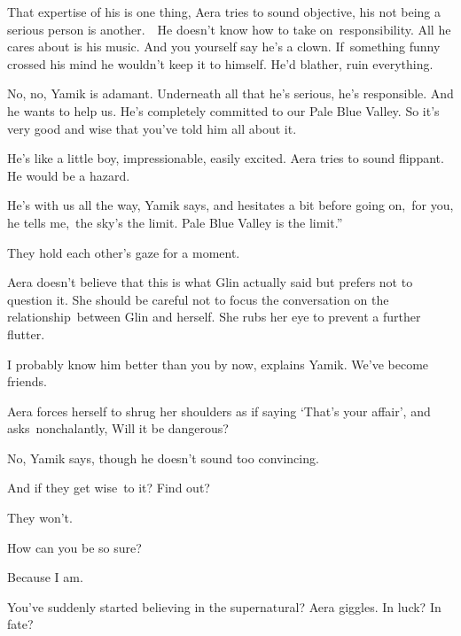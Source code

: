 \documentclass[letterpaper]{article}
\begin{document}
{\textquotedbl}That expertise of his is one thing,{\textquotedbl} Aera tries to sound objective, {\textquotedbl}his not
being a serious person is another.\ \ He doesn't know how to take on~responsibility. All he cares about is his music.
And you yourself say he's a clown. If~something funny crossed his mind he wouldn't keep it to himself. He'd blather,
ruin everything.{\textquotedbl} 

{\textquotedbl}No, no,{\textquotedbl} Yamik is adamant. {\textquotedbl}Underneath all that he's serious, he's
responsible. And he wants to help us. He's completely committed to our Pale Blue Valley. So it's very good and wise
that you've told him all about it.{\textquotedbl} 

{\textquotedbl}He's like a little boy, impressionable, easily excited.{\textquotedbl} Aera tries to sound flippant.
{\textquotedbl}He would be a hazard.{\textquotedbl}

{\textquotedbl}He's with us all the way,{\textquotedbl} Yamik says, and hesitates a bit before going
on,\textcolor{red}{\ }{\textquotedbl}for you, he tells me,~the sky's the limit. Pale Blue Valley is the limit.''

They hold each other's gaze for a moment.

Aera doesn't believe that this is what Glin actually said but prefers not to question it. She should be careful not to
focus the conversation on the relationship~between Glin and herself. She rubs her eye to prevent a further flutter.

{\textquotedbl}I probably know him better than you by now,{\textquotedbl} explains Yamik. {\textquotedbl}We've become
friends.{\textquotedbl} 

Aera forces herself to shrug her shoulders as if saying `That's your affair', and asks~nonchalantly, {\textquotedbl}Will
it be dangerous?{\textquotedbl} 

{\textquotedbl}No,{\textquotedbl} Yamik says, though he doesn't sound too convincing. 

{\textquotedbl}And if they get wise\textcolor{red}{\ }to it? Find out?{\textquotedbl} 

{\textquotedbl}They won't.{\textquotedbl}\ \ 

{\textquotedbl}How can you be so sure?{\textquotedbl} 

{\textquotedbl}Because I am.{\textquotedbl} 

{\textquotedbl}You've suddenly started believing in the supernatural?{\textquotedbl} Aera giggles. {\textquotedbl}In
luck? In fate?{\textquotedbl} 
\end{document}
